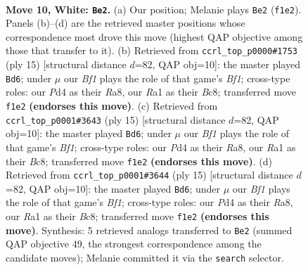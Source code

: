 \documentclass[11pt]{article}
\begin{document}
\clearpage

\begin{figure}[p]\centering
\begin{subfigure}{0.46\textwidth}\centering
\resizebox{\linewidth}{!}{%
\newchessgame
\chessboard[
  setfen={rn2kb1r/pp2qpp1/2p2n2/3p2Pp/3P4/2N2Q1P/PPP2P2/R1B1KB1R w KQkq - 1 10},
  showmover=false,
  pgfstyle=straightmove, color=movearrow, markmove={f1-e2}
]}
\caption{}
\end{subfigure}\hfill
\begin{subfigure}{0.46\textwidth}\centering
\resizebox{\linewidth}{!}{%
\newchessgame
\chessboard[
  setfen={r1b1kb1r/ppp2pp1/2n1pq1p/8/2QP4/4PN2/PP3PPP/RN2KB1R b KQkq - 0 8},
  showmover=false,
  pgfstyle=straightmove, color=movearrow, markmove={f8-d6}
]}
\caption{}
\end{subfigure}
\\[4pt]
\begin{subfigure}{0.46\textwidth}\centering
\resizebox{\linewidth}{!}{%
\newchessgame
\chessboard[
  setfen={r1b1kb1r/ppp2pp1/2n1pq1p/8/2QP4/4PN2/PP3PPP/RN2KB1R b KQkq - 0 8},
  showmover=false,
  pgfstyle=straightmove, color=movearrow, markmove={f8-d6}
]}
\caption{}
\end{subfigure}\hfill
\begin{subfigure}{0.46\textwidth}\centering
\resizebox{\linewidth}{!}{%
\newchessgame
\chessboard[
  setfen={r1b1kb1r/ppp2pp1/2n1pq1p/8/2QP4/4PN2/PP3PPP/RN2KB1R b KQkq - 0 8},
  showmover=false,
  pgfstyle=straightmove, color=movearrow, markmove={f8-d6}
]}
\caption{}
\end{subfigure}
\caption{\textbf{Move 10, White: \texttt{Be2}.} (a) Our position; Melanie plays \texttt{Be2} (\texttt{f1e2}). Panels (b)--(d) are the retrieved master positions whose correspondence most drove this move (highest QAP objective among those that transfer to it). (b) Retrieved from \texttt{ccrl\_top\_p0000\#1753} (ply 15) [structural distance $d$=82, QAP obj=10]: the master played \texttt{Bd6}; under $\mu$ our \emph{Bf1} plays the role of that game's \emph{Bf1}; cross-type roles: our \emph{P}d4 as their \emph{R}a8, our \emph{R}a1 as their \emph{B}c8; transferred move \texttt{f1e2} \textbf{(endorses this move)}. (c) Retrieved from \texttt{ccrl\_top\_p0001\#3643} (ply 15) [structural distance $d$=82, QAP obj=10]: the master played \texttt{Bd6}; under $\mu$ our \emph{Bf1} plays the role of that game's \emph{Bf1}; cross-type roles: our \emph{P}d4 as their \emph{R}a8, our \emph{R}a1 as their \emph{B}c8; transferred move \texttt{f1e2} \textbf{(endorses this move)}. (d) Retrieved from \texttt{ccrl\_top\_p0001\#3644} (ply 15) [structural distance $d$=82, QAP obj=10]: the master played \texttt{Bd6}; under $\mu$ our \emph{Bf1} plays the role of that game's \emph{Bf1}; cross-type roles: our \emph{P}d4 as their \emph{R}a8, our \emph{R}a1 as their \emph{B}c8; transferred move \texttt{f1e2} \textbf{(endorses this move)}. Synthesis: 5 retrieved analogs transferred to \texttt{Be2} (summed QAP objective 49, the strongest correspondence among the candidate moves); Melanie committed it via the \texttt{search} selector.}
\label{fig:thought-m18}
\end{figure}
\end{document}
